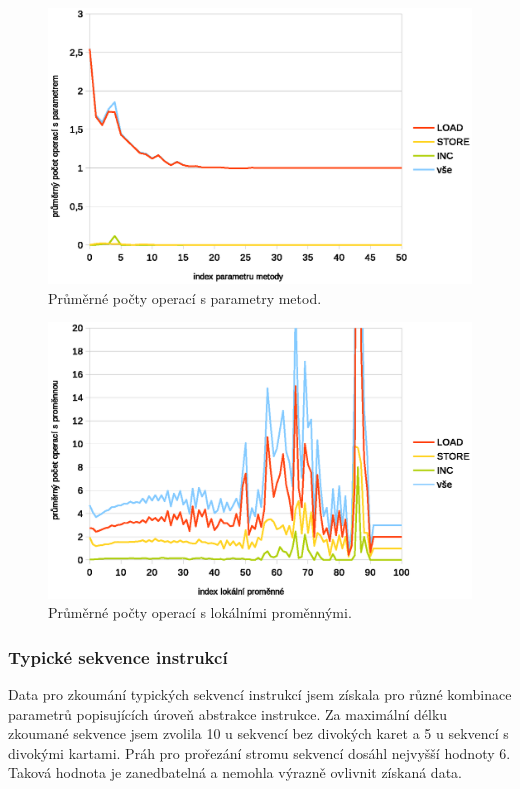 \begin{figure}[h!]
\centering
\includegraphics[scale=0.9]{fig/params}
\caption{Průměrné počty operací s parametry metod.}\label{params}
\end{figure}

\begin{figure}[h!]
\centering
\includegraphics[scale=0.9]{fig/locals} 
\caption{Průměrné počty operací s lokálními proměnnými.}\label{vars}
\end{figure}

\subsubsection{Typické sekvence instrukcí}

Data pro zkoumání typických sekvencí instrukcí jsem získala pro různé kombinace parametrů popisujících úroveň abstrakce instrukce. Za maximální délku zkoumané sekvence jsem zvolila 10 u sekvencí bez divokých karet a 5 u sekvencí s divokými kartami. Práh pro prořezání stromu sekvencí dosáhl nejvyšší hodnoty 6. Taková hodnota je zanedbatelná a nemohla výrazně ovlivnit získaná data. 


